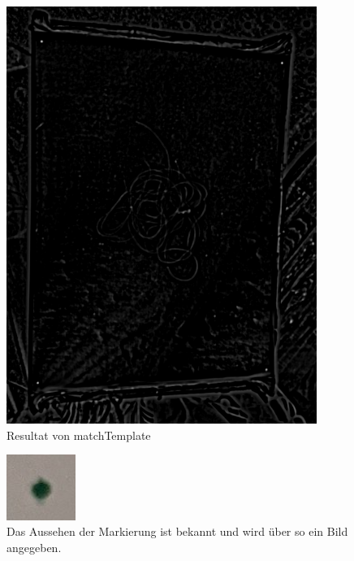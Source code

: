 \documentclass[german,a4paper,12pt]{llncs}
\begin{document}
\begin{figure}
	\centering
	\includegraphics[width=0.9\textwidth]{fig64/01match res.png}
	\caption[]{Resultat von matchTemplate}
	\label{img:matchTempate}
\end{figure}

\begin{figure}
	\centering
	\includegraphics[width=0.2\textwidth]{fig64/TemplateDot.jpg}
	\caption[]{Das Aussehen der Markierung ist bekannt und wird über so ein Bild angegeben.}
	\label{img:TemplateDot}
\end{figure}
\end{document}
